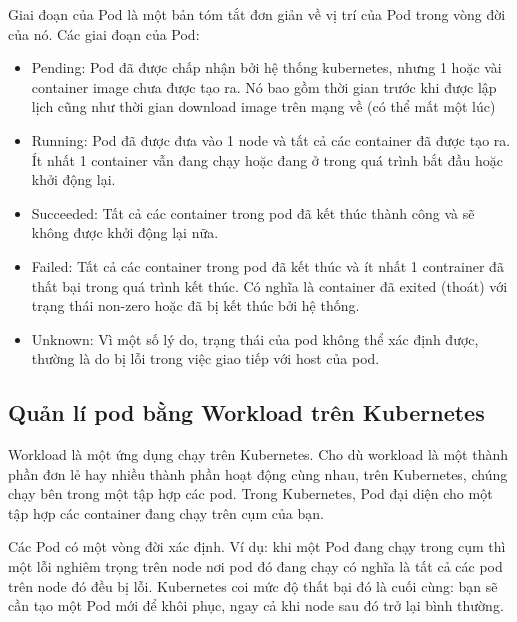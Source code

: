 \documentclass[14pt,a4paper]{report}
\begin{document}
	\hspace{0.3cm}Giai đoạn của Pod là một bản tóm tắt đơn giản về vị trí của Pod trong vòng đời của nó. Các giai đoạn của Pod:
	\begin{itemize}				
		\item Pending: Pod đã được chấp nhận bởi hệ thống kubernetes, nhưng 1 hoặc vài container image chưa được tạo ra. Nó bao gồm thời gian trước khi được lập lịch cũng như thời gian download image trên mạng về (có thể mất một lúc)
		\item Running: Pod đã được đưa vào 1 node và tất cả các container đã được tạo ra. Ít nhất 1 container vẫn đang chạy hoặc đang ở trong quá trình bắt đầu hoặc khởi động lại.
		\item  Succeeded: Tất cả các container trong pod đã kết thúc thành công và sẽ không được khởi động lại nữa.
		\item  Failed: Tất cả các container trong pod đã kết thúc và ít nhất 1 contrainer đã thất bại trong quá trình kết thúc. Có nghĩa là container đã exited (thoát) với trạng thái non-zero hoặc đã bị kết thúc bởi hệ thống.
		\item  Unknown: Vì một số lý do, trạng thái của pod không thể xác định được, thường là do bị lỗi trong việc giao tiếp với host của pod.
	\end{itemize}
	\subsection{Quản lí pod bằng Workload trên Kubernetes}
	{\hspace{1cm}Workload là một ứng dụng chạy trên Kubernetes. Cho dù workload là một thành phần đơn lẻ hay nhiều thành phần hoạt động cùng nhau, trên Kubernetes, chúng chạy bên trong một tập hợp các pod. Trong Kubernetes, Pod đại diện cho một tập hợp các container đang chạy trên cụm của bạn.\\}
	
	\hspace{0.3cm}Các Pod có một vòng đời xác định. Ví dụ: khi một Pod đang chạy trong cụm thì một lỗi nghiêm trọng trên node nơi pod đó đang chạy có nghĩa là tất cả các pod trên node đó đều bị lỗi. Kubernetes coi mức độ thất bại đó là cuối cùng: bạn sẽ cần tạo một Pod mới để khôi phục, ngay cả khi node sau đó trở lại bình thường.\\
	
\end{document}

